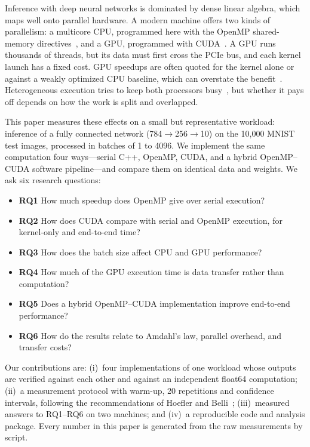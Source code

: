 Inference with deep neural networks is dominated by dense linear algebra, which maps well onto parallel hardware. A modern machine offers two kinds of parallelism: a multicore CPU, programmed here with the OpenMP shared-memory directives~\cite{dagum1998openmp}, and a GPU, programmed with CUDA~\cite{nickolls2008scalable}. A GPU runs thousands of threads, but its data must first cross the PCIe bus, and each kernel launch has a fixed cost. GPU speedups are often quoted for the kernel alone or against a weakly optimized CPU baseline, which can overstate the benefit~\cite{lee2010debunking,gregg2011data}. Heterogeneous execution tries to keep both processors busy~\cite{mittal2015survey}, but whether it pays off depends on how the work is split and overlapped.

This paper measures these effects on a small but representative workload: inference of a fully connected network (784$\to$256$\to$10) on the 10{,}000 MNIST test images, processed in batches of 1 to 4096. We implement the same computation four ways---serial C++, OpenMP, CUDA, and a hybrid OpenMP--CUDA software pipeline---and compare them on identical data and weights. We ask six research questions:

\begin{itemize}
\item \textbf{RQ1} How much speedup does OpenMP give over serial execution?
\item \textbf{RQ2} How does CUDA compare with serial and OpenMP execution, for kernel-only and end-to-end time?
\item \textbf{RQ3} How does the batch size affect CPU and GPU performance?
\item \textbf{RQ4} How much of the GPU execution time is data transfer rather than computation?
\item \textbf{RQ5} Does a hybrid OpenMP--CUDA implementation improve end-to-end performance?
\item \textbf{RQ6} How do the results relate to Amdahl's law, parallel overhead, and transfer costs?
\end{itemize}

\noindent Our contributions are: (i)~four implementations of one workload whose outputs are verified against each other and against an independent float64 computation; (ii)~a measurement protocol with warm-up, 20 repetitions and confidence intervals, following the recommendations of Hoefler and Belli~\cite{hoefler2015scientific}; (iii)~measured answers to RQ1--RQ6 on two machines; and (iv)~a reproducible code and analysis package. Every number in this paper is generated from the raw measurements by script.
